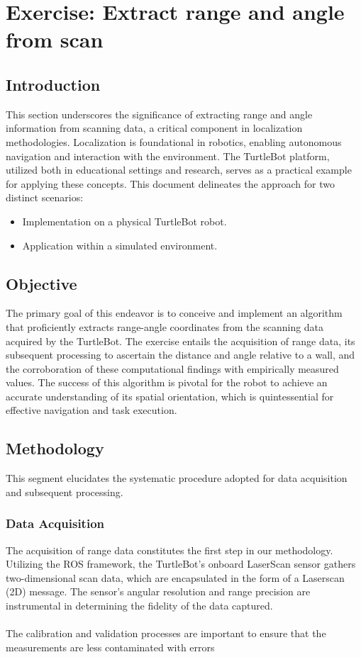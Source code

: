 \documentclass[12pt,a4paper]{article}
\begin{document}
	
	\clearpage
	\section{Exercise: Extract range and angle from scan}
	\subsection{Introduction}
	This section underscores the significance of extracting range and angle information from scanning data, a critical component in localization methodologies. Localization is foundational in robotics, enabling autonomous navigation and interaction with the environment. The TurtleBot platform, utilized both in educational settings and research, serves as a practical example for applying these concepts. This document delineates the approach for two distinct scenarios:
	\begin{itemize}
		\item Implementation on a physical TurtleBot robot.
		\item Application within a simulated environment.
	\end{itemize}
	
	\subsection{Objective}
	The primary goal of this endeavor is to conceive and implement an algorithm that proficiently extracts range-angle coordinates from the scanning data acquired by the TurtleBot. The exercise entails the acquisition of range data, its subsequent processing to ascertain the distance and angle relative to a wall, and the corroboration of these computational findings with empirically measured values. The success of this algorithm is pivotal for the robot to achieve an accurate understanding of its spatial orientation, which is quintessential for effective navigation and task execution.
	
	
	\subsection{Methodology}
	This segment elucidates the systematic procedure adopted for data acquisition and subsequent processing.
	
	\subsubsection{Data Acquisition}
	The acquisition of range data constitutes the first step in our methodology. Utilizing the ROS framework, the TurtleBot's onboard LaserScan sensor gathers two-dimensional scan data, which are encapsulated in the form of a Laserscan (2D) message. The sensor's angular resolution and range precision are instrumental in determining the fidelity of the data captured.
	\\\\
	The calibration and validation processes are important to ensure that the measurements are less contaminated with errors
	
\end{document}
